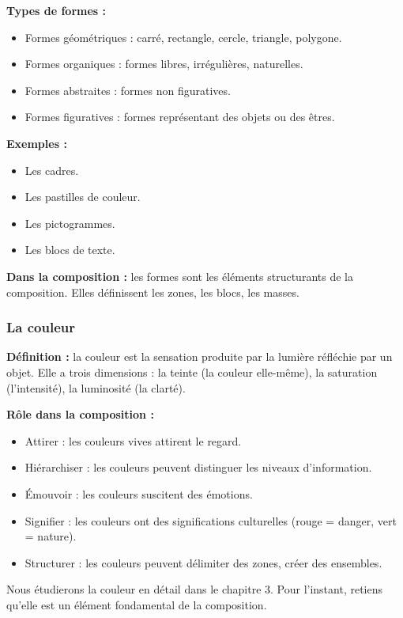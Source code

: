 \textbf{Types de formes :}
\begin{itemize}
  \item Formes géométriques : carré, rectangle, cercle, triangle, polygone.
  \item Formes organiques : formes libres, irrégulières, naturelles.
  \item Formes abstraites : formes non figuratives.
  \item Formes figuratives : formes représentant des objets ou des êtres.
\end{itemize}

\textbf{Exemples :}
\begin{itemize}
  \item Les cadres.
  \item Les pastilles de couleur.
  \item Les pictogrammes.
  \item Les blocs de texte.
\end{itemize}

\textbf{Dans la composition :} les formes sont les éléments structurants de la composition. Elles définissent les zones, les blocs, les masses.

\subsubsection{La couleur}

\textbf{Définition :} la couleur est la sensation produite par la lumière réfléchie par un objet. Elle a trois dimensions : la teinte (la couleur elle-même), la saturation (l'intensité), la luminosité (la clarté).

\textbf{Rôle dans la composition :}
\begin{itemize}
  \item Attirer : les couleurs vives attirent le regard.
  \item Hiérarchiser : les couleurs peuvent distinguer les niveaux d'information.
  \item Émouvoir : les couleurs suscitent des émotions.
  \item Signifier : les couleurs ont des significations culturelles (rouge = danger, vert = nature).
  \item Structurer : les couleurs peuvent délimiter des zones, créer des ensembles.
\end{itemize}

Nous étudierons la couleur en détail dans le chapitre 3. Pour l'instant, retiens qu'elle est un élément fondamental de la composition.

